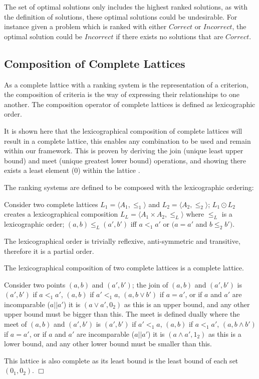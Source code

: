 The set of optimal solutions only includes the highest ranked solutions,
as with the definition of solutions, these optimal solutions could be undesirable.
For instance given a problem which is ranked with either $Correct$ or $Incorrect$, 
the optimal solution could be $Incorrect$ if there exists no solutions that are $Correct$. 

\subsection{Composition of Complete Lattices}
\label{sec:composition}
As a complete lattice with a ranking system is the representation of a criterion,
the composition of criteria is the way of expressing their relationships to one another. 
The composition operator of complete lattices is defined as lexicographic order.

It is shown here that the lexicographical composition of complete lattices will result in a complete lattice,
this enables any combination to be used and remain within our framework.
This is proven by deriving the join (unique least upper bound) and meet (unique greatest lower bound) operations,
and showing there exists a least element ($0$) within the lattice \cite{davey1990introduction}. 

The ranking systems are defined to be composed with the lexicographic ordering:
\begin{defs}
\label{def:lex_order}
Consider two complete lattices $L_1 = \langle A_1, \leq_1 \rangle$ and $L_2 = \langle A_2, \leq_2 \rangle$;
$L_1 \odot L_2$ creates a lexicographical composition  $L_L = \langle A_1 \times A_2, \leq_L \rangle$
where $\leq_L$ is a lexicographic order;
$(a,b) \leq_{L} (a',b')$ iff $a <_{1} a'$ or $(a = a'$ and $b \leq_{2} b')$.
\end{defs}

The lexicographical order is trivially reflexive, anti-symmetric and transitive, therefore it is a partial order.
\begin{prop}
The lexicographical composition of two complete lattices is a complete lattice.
\end{prop}
\begin{prof}
Consider two points $(a,b)$ and $(a',b')$; 
the join of $(a,b)$ and $(a',b')$ is $(a',b')$ if $a <_1 a'$,
$(a,b)$ if $a' <_1 a$,
$(a, b \vee b')$ if $a = a'$,
or if $a$ and $a'$ are incomparable ($a||a'$) it is $(a \vee a', 0_2)$
as this is an upper bound, and any other upper bound must be bigger than this.
The meet is defined dually where the meet of $(a,b)$ and $(a',b')$ is $(a',b')$ if $a' <_1 a$,
$(a,b)$ if $a <_1 a'$,
$(a, b \wedge b')$ if $a = a'$,
or if $a$ and $a'$ are incomparable ($a||a'$) it is $(a \wedge a',1_2)$
as this is a lower bound, and any other lower bound must be smaller than this.

This lattice is also complete as its least bound is the least bound of each set $(0_1,0_2)$.
$\Box$\end{prof}

